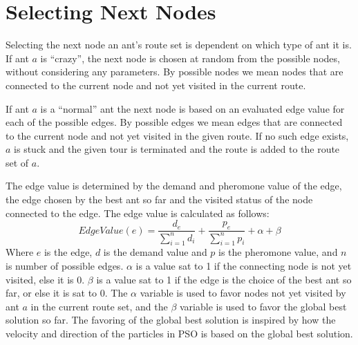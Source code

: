 \section{Selecting Next Nodes}

Selecting the next node an ant's route set is dependent on which type of ant it is. If ant $a$ is ``crazy'', the next node is chosen at random from the possible nodes, without considering any parameters. By possible nodes we mean nodes that are connected to the current node and not yet visited in the current route.

If ant $a$ is a ``normal'' ant the next node is based on an evaluated edge value for each of the possible edges. By possible edges we mean edges that are connected to the current node and not yet visited in the given route. If no such edge exists, $a$ is stuck and the given tour is terminated and the route is added to the route set of $a$. 

The edge value is determined by the demand and pheromone value of the edge, the edge chosen by the best ant so far and the visited status of the node connected to the edge. The edge value is calculated as follows: 
\newline
$$EdgeValue(e) = \frac{d_e}{\sum\limits^{n}_{i=1}d_i} + \frac{p_e}{\sum\limits^{n}_{i=1}p_i} + \alpha + \beta$$
\newline
Where $e$ is the edge, $d$ is the demand value and $p$ is the pheromone value, and $n$ is number of possible edges. $\alpha$ is a value sat to 1 if the connecting node is not yet visited, else it is 0. $\beta$ is a value sat to 1 if the edge is the choice of the best ant so far, or else it is sat to 0. The $\alpha$ variable is used to favor nodes not yet visited by ant $a$ in the current route set, and the $\beta$ variable is used to favor the global best solution so far. The favoring of the global best solution is inspired by how the velocity and direction of the particles in PSO is based on the global best solution. 

